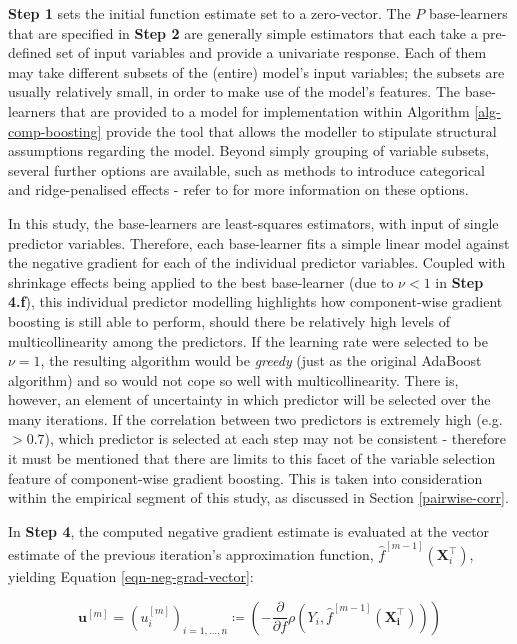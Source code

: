 \documentclass{article}
\begin{document}
\textbf{Step 1} sets the initial function estimate set to a zero-vector. The $P$ base-learners that are specified in \textbf{Step 2} are generally simple estimators that each take a pre-defined set of input variables and provide a univariate response. Each of them may take different subsets of the (entire) model's input variables; the subsets are usually relatively small, in order to make use of the model's features. The base-learners that are provided to a model for implementation within Algorithm \eqref{alg-comp-boosting} provide the tool that allows the modeller to stipulate structural assumptions regarding the model. Beyond simply grouping of variable subsets, several further options are available, such as methods to introduce categorical and ridge-penalised effects - refer to \cite{Hofner2012} for more information on these options.

In this study, the base-learners are least-squares estimators, with input of single predictor variables. Therefore, each base-learner fits a simple linear model against the negative gradient for each of the individual predictor variables. Coupled with shrinkage effects being applied to the best base-learner (due to $\nu < 1$ in \textbf{Step 4.f}), this individual predictor modelling highlights how component-wise gradient boosting is still able to perform, should there be relatively high levels of multicollinearity among the predictors. If the learning rate were selected to be $\nu = 1$, the resulting algorithm would be \emph{greedy} (just as the original AdaBoost algorithm) and so would not cope so well with multicollinearity. There is, however, an element of uncertainty in which predictor will be selected over the many iterations. If the correlation between two predictors is extremely high (e.g. $> 0.7$), which predictor is selected at each step may not be consistent - therefore it must be mentioned that there are limits to this facet of the variable selection feature of component-wise gradient boosting. This is taken into consideration within the empirical segment of this study, as discussed in Section \ref{pairwise-corr}.

In \textbf{Step 4}, the computed negative gradient estimate is evaluated at the vector estimate of the previous iteration's approximation function, $\hat f^{[m-1]} \left( \mathbf{X}_{i}^\top \right)$, yielding Equation \eqref{eqn-neg-grad-vector}:

\begin{equation}
  \mathbf{u}^{[m]} = \left( u_{i}^{[m]} \right)_{i = 1, …, n} \coloneqq \left( - \frac{\partial}{\partial f}\rho\left(Y_i, \hat f^{[m-1]} \left( \mathbf{X_i^\top} \right) \right) \right)
  \label{eqn-neg-grad-vector}
\end{equation}
\end{document}
